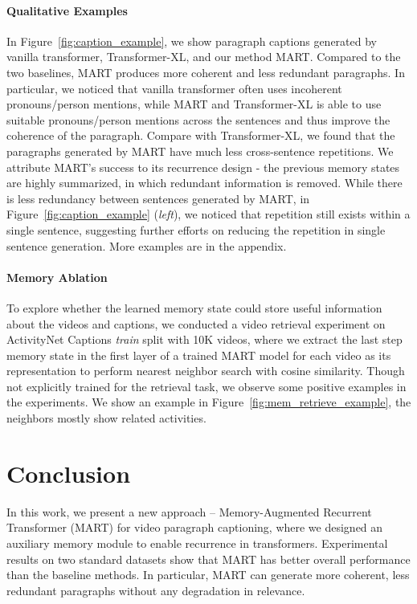 \documentclass[11pt,a4paper]{article}
\begin{document}
\paragraph{Qualitative Examples} 
In Figure~\ref{fig:caption_example}, we show paragraph captions generated by vanilla transformer, Transformer-XL, and our method MART. 
Compared to the two baselines, MART produces more coherent and less redundant paragraphs. 
In particular, we noticed that vanilla transformer often uses incoherent pronouns/person mentions, while MART and Transformer-XL is able to use suitable pronouns/person mentions across the sentences and thus improve the coherence of the paragraph.
Compare with Transformer-XL, we found that the paragraphs generated by MART have much less cross-sentence repetitions. 
We attribute MART's success to its recurrence design - the previous memory states are highly summarized, in which redundant information is removed.
While there is less redundancy between sentences generated by MART, in Figure~\ref{fig:caption_example} (\textit{left}), we noticed that repetition still exists within a single sentence, suggesting further efforts on reducing the repetition in single sentence generation. More examples are in the appendix. 


\paragraph{Memory Ablation}
To explore whether the learned memory state could store useful information about the videos and captions, we conducted a video retrieval experiment on ActivityNet Captions \textit{train} split with 10K videos, where we extract the last step memory state in the first layer of a trained MART model for each video as its representation to perform nearest neighbor search with cosine similarity. 
Though not explicitly trained for the retrieval task, we observe some positive examples in the experiments. We show an example in Figure~\ref{fig:mem_retrieve_example}, the neighbors mostly show related activities.
 \section{Conclusion}\label{conclusion}
In this work, we present a new approach -- Memory-Augmented Recurrent Transformer (MART) for video paragraph captioning, where we designed an auxiliary memory module to enable recurrence in transformers.
Experimental results on two standard datasets show that MART has better overall performance than the baseline methods. 
In particular, MART can generate more coherent, less redundant paragraphs without any degradation in relevance.
\end{document}
